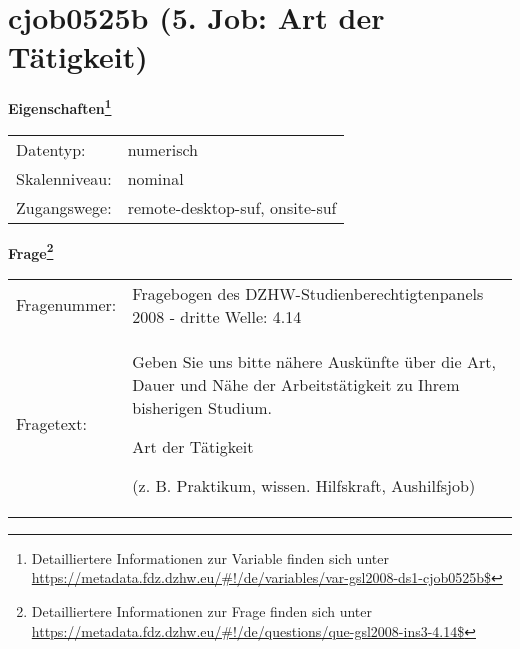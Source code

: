 
    \setcounter{footnote}{0}

    \vspace*{-1.8cm}
	\section{cjob0525b (5. Job: Art der Tätigkeit)}
	\label{section:cjob0525b}



    \vspace*{0.5cm}
    \noindent\textbf{Eigenschaften\footnote{Detailliertere Informationen zur Variable finden sich unter
		\url{https://metadata.fdz.dzhw.eu/\#!/de/variables/var-gsl2008-ds1-cjob0525b$}}}\\
	\begin{tabularx}{\hsize}{@{}lX}
	Datentyp: & numerisch \\
	Skalenniveau: & nominal \\
	Zugangswege: &
	  remote-desktop-suf, 
	  onsite-suf
 \\
    \end{tabularx}



				\vspace*{0.5cm}
                \noindent\textbf{Frage\footnote{Detailliertere Informationen zur Frage finden sich unter
		              \url{https://metadata.fdz.dzhw.eu/\#!/de/questions/que-gsl2008-ins3-4.14$}}}\\
				\begin{tabularx}{\hsize}{@{}lX}
					Fragenummer: &
					  Fragebogen des DZHW-Studienberechtigtenpanels 2008 - dritte Welle:
					  4.14
 \\
					Fragetext: & Geben Sie uns bitte nähere Auskünfte über die Art, Dauer und Nähe der Arbeitstätigkeit zu Ihrem bisherigen Studium.\par  Art der Tätigkeit\par  (z. B. Praktikum, wissen. Hilfskraft, Aushilfsjob) \\
				\end{tabularx}





